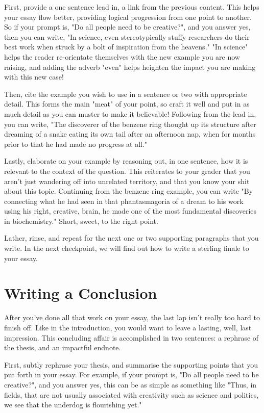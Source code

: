 \documentclass[DIV=calc,11pt,parskip,numbers=noenddot]{scrartcl} %
\begin{document}
First, provide a one sentence lead in, a link from the previous content. This helps your essay flow better, providing logical progression from one point to another. So if your prompt is, "Do all people need to be creative?", and you answer yes, then you can write, "In science, even stereotypically stuffy researchers do their best work when struck by a bolt of inspiration from the heavens." "In science" helps the reader re-orientate themselves with the new example you are now raising, and adding the adverb "even" helps heighten the impact you are making with this new case!

Then, cite the example you wish to use in a sentence or two with appropriate detail. This forms the main "meat" of your point, so craft it well and put in as much detail as you can muster to make it believable! Following from the lead in, you can write, "The discoverer of the benzene ring thought up its structure after dreaming of a snake eating its own tail after an afternoon nap, when for months prior to that he had made no progress at all."

Lastly, elaborate on your example by reasoning out, in one sentence, how it is relevant to the context of the question. This reiterates to your grader that you aren’t just wandering off into unrelated territory, and that you know your shit about this topic. Continuing from the benzene ring example, you can write "By connecting what he had seen in that phantasmagoria of a dream to his work using his right, creative, brain, he made one of the most fundamental discoveries in biochemistry." Short, sweet, to the right point.

Lather, rinse, and repeat for the next one or two supporting paragraphs that you write. In the next checkpoint, we will find out how to write a sterling finale to your essay.
\section{Writing a Conclusion}
After you’ve done all that work on your essay, the last lap isn’t really too hard to finish off. Like in the introduction, you would want to leave a lasting, well, last impression. This concluding affair is accomplished in two sentences: a rephrase of the thesis, and an impactful endnote.

First, subtly rephrase your thesis, and summarise the supporting points that you put forth in your essay. For example, if your prompt is, "Do all people need to be creative?", and you answer yes, this can be as simple as something like "Thus, in fields, that are not usually associated with creativity such as science and politics, we see that the underdog is flourishing yet."
\end{document}
